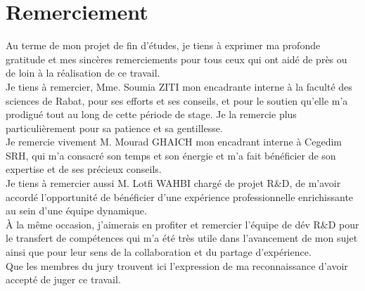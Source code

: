 {}
\noindent \section*{Remerciement}
\vspace{0.25cm}
Au terme de mon projet de fin d’études, je tiens à exprimer ma profonde gratitude et mes sincères remerciements pour tous ceux qui ont aidé de près ou de loin à la réalisation de ce travail.\\

Je tiens à remercier, Mme. Soumia ZITI mon encadrante interne à la faculté des sciences de Rabat, pour ses efforts et ses conseils, et pour le soutien qu’elle m’a prodigué tout au long de cette période de stage. Je la remercie plus particulièrement pour sa patience et sa gentillesse.\\

Je remercie vivement M. Mourad GHAICH  mon encadrant interne à Cegedim SRH, qui m'a consacré son temps et son énergie et m'a fait bénéficier de son expertise et de ses précieux conseils.\\ 

Je tiens à remercier aussi M. Lotfi WAHBI chargé de projet R\&D, de m'avoir accordé l'opportunité de bénéficier d'une expérience professionnelle enrichissante au sein d'une équipe dynamique.\\

À la même occasion, j’aimerais en profiter et remercier l’équipe de dév R\&D pour le transfert de compétences qui m'a été très utile dans l'avancement de mon sujet ainsi que pour leur sens de la collaboration et du partage d'expérience. \\

Que les membres du jury trouvent ici l’expression de ma reconnaissance d’avoir accepté de juger ce travail.
